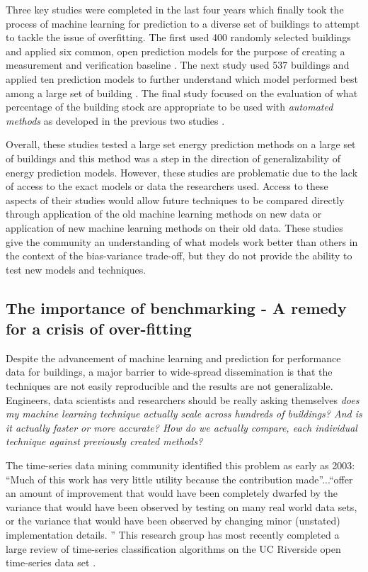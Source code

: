 \documentclass[preprint,12pt]{elsarticle}
\begin{document}
Three key studies were completed in the last four years which finally took the process of machine learning for prediction to a diverse set of buildings to attempt to tackle the issue of overfitting. The first used 400 randomly selected buildings and applied six common, open prediction models for the purpose of creating a measurement and verification baseline \cite{Granderson2015AutomatedModels}. The next study used 537 buildings and applied ten prediction models to further understand which model performed best among a large set of building \cite{Granderson2016AccuracyBuildings}. The final study focused on the evaluation of what percentage of the building stock are appropriate to be used with \emph{automated methods} as developed in the previous two studies \cite{Grandersona2017ApplicationData}. 

Overall, these studies tested a large set energy prediction methods on a large set of buildings and this method was a step in the direction of generalizability of energy prediction models. However, these studies are problematic due to the lack of access to the exact models or data the researchers used. Access to these aspects of their studies would allow future techniques to be compared directly through application of the old machine learning methods on new data or application of new machine learning methods on their old data. These studies give the community an understanding of what models work better than others in the context of the bias-variance trade-off, but they do not provide the ability to test new models and techniques.

\subsection{The importance of benchmarking - A remedy for a crisis of over-fitting}

Despite the advancement of machine learning and prediction for performance data for buildings, a major barrier to wide-spread dissemination is that the techniques are not easily reproducible and the results are not generalizable. Engineers, data scientists and researchers should be really asking themselves \emph{does my machine learning technique actually scale across hundreds of buildings? And is it actually faster or more accurate? How do we actually compare, each individual technique against previously created methods?}

The time-series data mining community identified this problem as early as 2003: ``Much of this work has very little utility because the contribution made''...``offer an amount of improvement that would have been completely dwarfed by the variance that would have been observed by testing on many real world data sets, or the variance that would have been observed by changing minor (unstated) implementation details. \cite{Keogh2003}'' This research group has most recently completed a large review of time-series classification algorithms on the UC Riverside open time-series data set \cite{Bagnall2017TheAdvances, UCRArchive}.
\end{document}

